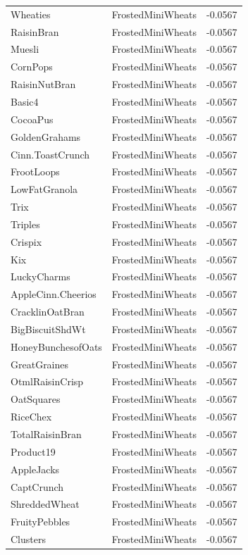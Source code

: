 \begin{longtable}{llr}
Wheaties & FrostedMiniWheats & -0.0567 \\
RaisinBran & FrostedMiniWheats & -0.0567 \\
Muesli & FrostedMiniWheats & -0.0567 \\
CornPops & FrostedMiniWheats & -0.0567 \\
RaisinNutBran & FrostedMiniWheats & -0.0567 \\
Basic4 & FrostedMiniWheats & -0.0567 \\
CocoaPus & FrostedMiniWheats & -0.0567 \\
GoldenGrahams & FrostedMiniWheats & -0.0567 \\
Cinn.ToastCrunch & FrostedMiniWheats & -0.0567 \\
FrootLoops & FrostedMiniWheats & -0.0567 \\
LowFatGranola & FrostedMiniWheats & -0.0567 \\
Trix & FrostedMiniWheats & -0.0567 \\
Triples & FrostedMiniWheats & -0.0567 \\
Crispix & FrostedMiniWheats & -0.0567 \\
Kix & FrostedMiniWheats & -0.0567 \\
LuckyCharms & FrostedMiniWheats & -0.0567 \\
AppleCinn.Cheerios & FrostedMiniWheats & -0.0567 \\
CracklinOatBran & FrostedMiniWheats & -0.0567 \\
BigBiscuitShdWt & FrostedMiniWheats & -0.0567 \\
HoneyBunchesofOats & FrostedMiniWheats & -0.0567 \\
GreatGraines & FrostedMiniWheats & -0.0567 \\
OtmlRaisinCrisp & FrostedMiniWheats & -0.0567 \\
OatSquares & FrostedMiniWheats & -0.0567 \\
RiceChex & FrostedMiniWheats & -0.0567 \\
TotalRaisinBran & FrostedMiniWheats & -0.0567 \\
Product19 & FrostedMiniWheats & -0.0567 \\
AppleJacks & FrostedMiniWheats & -0.0567 \\
CaptCrunch & FrostedMiniWheats & -0.0567 \\
ShreddedWheat & FrostedMiniWheats & -0.0567 \\
FruityPebbles & FrostedMiniWheats & -0.0567 \\
Clusters & FrostedMiniWheats & -0.0567 \\

\end{longtable}
